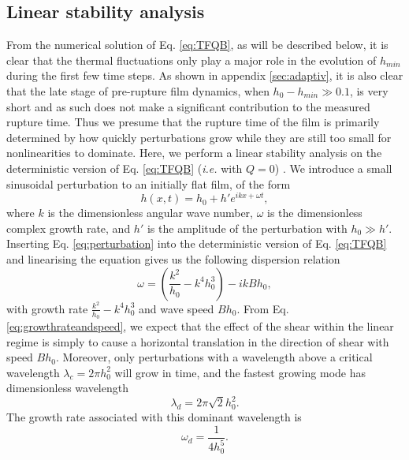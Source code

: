 \documentclass[
 onecolumn,
 amsmath,amssymb,
floatfix,superscriptaddress
]{revtex4-2}
\begin{document}
\subsection{Linear stability analysis}
\label{subsec:teori}
 From the numerical solution of Eq. \eqref{eq:TFQB}, as will be described below, it is clear that the thermal fluctuations only play a major role in the evolution of $h_{min}$ during the first few time steps. As shown in appendix \ref{sec:adaptiv}, it is also clear that the late stage of pre-rupture film dynamics, when $h_0-h_{min}\gg 0.1$, is very short and as such does not make a significant contribution to the measured rupture time. Thus we presume that the rupture time of the film is primarily determined by how quickly perturbations grow while they are still too small for nonlinearities to dominate. Here, we perform a linear stability analysis on the deterministic version of Eq. \eqref{eq:TFQB} (\textit{i.e.} with $Q=0$) \cite{davis_gratton_davis_2010,Kadri2021}. We introduce a small sinusoidal perturbation to an initially flat film, of the form
\begin{equation}\label{eq:perturbation}
h(x,t)=h_0 + h'e^{ikx+\omega t}, 
\end{equation}
where $k$ is the dimensionless angular wave number, $\omega$ is the dimensionless complex growth rate, and $h'$ is the amplitude of the perturbation with $h_0\gg h'$.  Inserting Eq. \eqref{eq:perturbation} into the deterministic version of Eq. \eqref{eq:TFQB} and linearising the equation gives us the following dispersion relation
\begin{equation} \label{eq:growthrateandspeed}
\omega = \left({\frac{k^2}{h_0}-k^4 h_0^3}\right) - ik{Bh_0},
\end{equation}
with growth rate $\frac{k^2}{h_0}-k^4 h_0^3$ and wave speed $Bh_0$. From Eq. \eqref{eq:growthrateandspeed}, we expect that the effect of the shear within the linear regime is simply to cause a horizontal translation in the direction of shear with speed $Bh_0$. Moreover, only perturbations with a wavelength above a critical wavelength $\lambda _c = 2\pi h_0^2$ will grow in time, and the fastest growing mode has dimensionless wavelength
\begin{equation}\label{eq:lambdad}
\lambda _d = 2\pi \sqrt{2}h_0^2.
\end{equation}
The growth rate associated with this dominant wavelength is
\begin{equation}\label{eq:maxgrowth}
\omega _d = \frac{1}{4h_0^5}. 
\end{equation}
\end{document}
